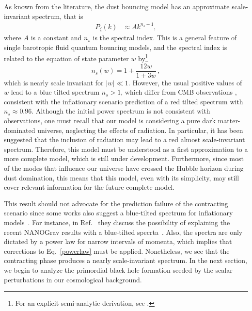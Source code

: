 \documentclass[a4paper,11pt]{article}
\begin{document}
As known from the literature, the dust bouncing model has an approximate scale-invariant spectrum, that is
\begin{align}
\label{powerlaw}
    P_{{\zeta}}(k) &\approx A k^{n_s-1}
,\end{align}
where $A$ is a constant and $n_s$ is the spectral index. This is a general feature of single barotropic fluid quantum bouncing models, and the spectral index is related to the equation of state parameter $w$ by\footnote{For an explicit semi-analytic derivation, see \cite{nelson_peter_bouncing_original}.} 
%
\begin{equation}
    n_{s}(w) = 1 + \frac{ 12w }{ 1 + 3w }\, ,
\end{equation}
%
which is nearly scale invariant for $|w| \ll 1 $. However, the usual positive values of $w$ lead to a blue tilted spectrum $n_{s} > 1$, which differ from CMB observations \cite{planck_inflation_constraints}, consistent with the inflationary scenario prediction of a red tilted spectrum with $n_{s} \approx 0.96$. Although the initial power spectrum is not consistent with observations, one must recall that our model is considering a pure dark matter-dominated universe, neglecting the effects of radiation. In particular, it has been suggested \cite{nelson2021bouncing} that the inclusion of radiation may lead to a red almost scale-invariant spectrum. Therefore, this model must be understood as a first approximation to a more complete model, which is still under development. Furthermore, since most of the modes that influence our universe have crossed the Hubble horizon during dust domination, this means that this model, even with its simplicity, may still cover relevant information for the future complete model.

This result should not advocate for the prediction failure of the contracting scenario since some works also suggest a blue-tilted spectrum for inflationary models~\cite{Wang2014, Cai2015}. For instance, in Ref.~\cite{Kuroyanagi2021} they discuss the possibility of explaining the recent NANOGrav results with a blue-tilted specrta~\cite{Wu2023}. Also, the spectra are only dictated by a power law for narrow intervals of momenta, which implies that corrections to Eq.~\eqref{powerlaw} must be applied. Nonetheless, we see that the contracting phase produces a nearly scale-invariant spectrum. In the next section, we begin to analyze the primordial black hole formation seeded by the scalar perturbations in our cosmological background. 
\end{document}
